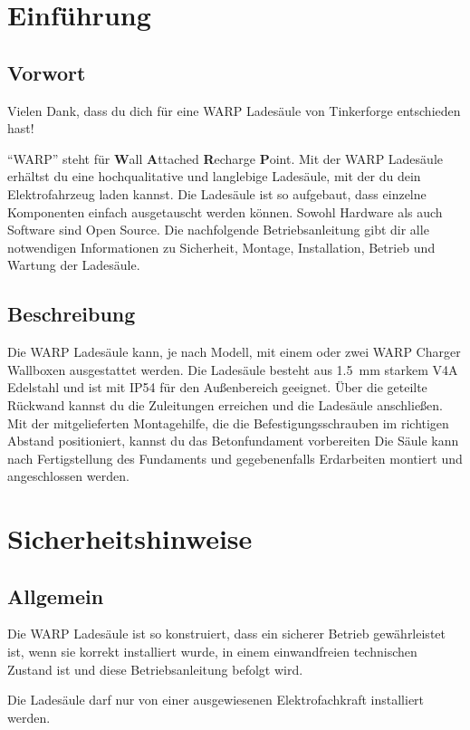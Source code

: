 \documentclass[a4paper,10pt]{article}
\newcommand{\hint}[1]{\begin{tcolorbox}[colback=boxgray,colframe=black,coltext=
white,title=Hinweis]#1\end{tcolorbox}}
\begin{document}
\begin{multicols*}{2}
	\tableofcontents \section{Einführung}
	\subsection{Vorwort} Vielen Dank, dass du
	dich für eine WARP Ladesäule von Tinkerforge entschieden hast!

	\enquote{WARP} steht
	für \textbf{W}all \textbf{A}ttached
	\textbf{R}echarge \textbf{P}oint. Mit der WARP Ladesäule
	erhältst du eine hochqualitative und langlebige Ladesäule, mit der du dein
	Elektrofahrzeug laden kannst. Die Ladesäule ist so aufgebaut, dass
	einzelne Komponenten einfach ausgetauscht werden können. Sowohl Hardware als
	auch Software sind Open Source. Die nachfolgende Betriebsanleitung gibt dir
	alle notwendigen Informationen zu Sicherheit, Montage, Installation, Betrieb
	und Wartung der Ladesäule.

	\subsection{Beschreibung}

	Die WARP Ladesäule kann, je nach Modell, mit einem oder zwei WARP Charger Wallboxen
	ausgestattet werden. Die Ladesäule besteht aus
	\SI{1.5}{\milli\meter} starkem V4A Edelstahl und ist mit IP54 für den
	Außenbereich geeignet. Über die geteilte Rückwand kannst du
	die Zuleitungen erreichen und die Ladesäule anschließen. Mit der
	mitgelieferten Montagehilfe, die die Befestigungsschrauben im
	richtigen Abstand positioniert, kannst du das Betonfundament vorbereiten
	Die Säule kann nach Fertigstellung des Fundaments und gegebenenfalls
	Erdarbeiten montiert und angeschlossen werden.

	\section{Sicherheitshinweise}
	\subsection{Allgemein}
	Die WARP Ladesäule ist so konstruiert, dass ein sicherer Betrieb gewährleistet ist,
	wenn sie korrekt installiert wurde, in einem einwandfreien technischen Zustand
	ist und diese Betriebsanleitung befolgt wird. \hint{Die Ladesäule darf nur von einer ausgewiesenen Elektrofachkraft installiert
		werden.}


\end{multicols*}
\end{document}
